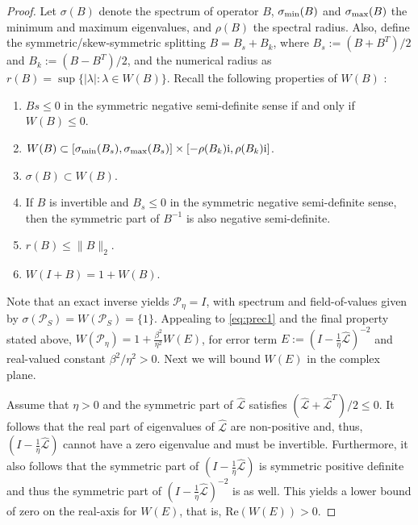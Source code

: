 \documentclass[review]{siamart}
\begin{document}
\begin{proof}
Let $\sigma(B)$ denote the spectrum of operator $B$, $\sigma_{\textnormal{min}}(B)$
and $\sigma_{\textnormal{max}}(B)$ the minimum and maximum eigenvalues, and $\rho(B)$
the spectral radius. Also, define the symmetric/skew-symmetric splitting
$B = B_s + B_k$, where $B_s := (B+B^T)/2$ and $B_k := (B - B^T)/2$, and the numerical
radius as $r(B) = \sup \{ |\lambda| : \lambda \in W(B) \}$. Recall
the following properties of $W(B)$ \cite{gustafson1997numerical,mees1979domains}:
%
\begin{enumerate}
	\item $Bs \leq 0$ in the symmetric negative semi-definite sense
	if and only if $W(B) \leq 0$.  

	\item $W(B)\subset [\sigma_{\textnormal{min}}(B_s), \sigma_{\textnormal{max}}(B_s)] \times
	[-\rho(B_k)\mathrm{i}, \rho(B_k)\mathrm{i}]$.

	\item $\sigma(B) \subset W(B)$.

	\item If $B$ is invertible and $B_s \leq 0$ in the symmetric negative semi-definite
	sense, then the symmetric part of $B^{-1}$ is also negative semi-definite.

	\item $r(B) \leq \|B\|_2$.

	\item $W(I + B) = 1 + W(B)$.
\end{enumerate}
%
Note that an exact inverse yields $\mathcal{P}_\eta = I$, with spectrum
and field-of-values given by $\sigma(\mathcal{P}_S) = W(\mathcal{P}_S) = \{1\}$.
Appealing to \eqref{eq:prec1} and the final property stated above, $W(\mathcal{P}_\eta)
= 1 + \tfrac{\beta^2}{\eta^2}W(E)$, for error term $E := (I - \tfrac{1}{\eta}\widehat{\mathcal{L}})^{-2}$
and real-valued constant $\beta^2/\eta^2 > 0$. Next we will bound $W(E)$ in the complex plane.

Assume that $\eta > 0$ and the symmetric part of $\widehat{\mathcal{L}}$ satisfies
$(\widehat{\mathcal{L}}+\widehat{\mathcal{L}}^T)/2 \leq 0$.
It follows that the real part of eigenvalues of $\widehat{\mathcal{L}}$ are non-positive and,
thus, $(I - \tfrac{1}{\eta}\widehat{\mathcal{L}})$ cannot have a zero eigenvalue and must be
invertible. Furthermore, it also follows that the symmetric part of
$(I - \tfrac{1}{\eta}\widehat{\mathcal{L}})$ is symmetric positive definite and thus
the symmetric part of $(I - \tfrac{1}{\eta}\widehat{\mathcal{L}})^{-2}$ is as well.
This yields a lower bound of zero on the real-axis for $W(E)$, that is,
Re$(W(E)) > 0$. 


\end{proof}
\end{document}
